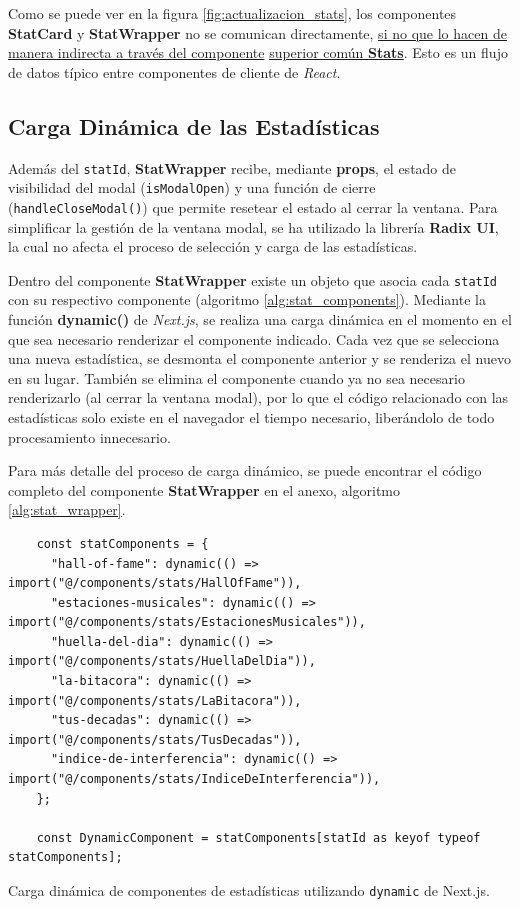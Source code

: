 Como se puede ver en la figura \ref{fig:actualizacion_stats}, los componentes \textbf{StatCard} y \textbf{StatWrapper} no se comunican directamente, \underline{si no que lo hacen de manera indirecta a través del componente} \underline{superior común \textbf{Stats}}. Esto es un flujo de datos típico entre componentes de cliente de \textit{React}.

\subsection*{Carga Dinámica de las Estadísticas}

Además del \texttt{statId}, \textbf{StatWrapper} recibe, mediante \textbf{props}, el estado de visibilidad del modal (\texttt{isModalOpen}) y una función de cierre (\texttt{handleCloseModal()}) que permite resetear el estado al cerrar la ventana. Para simplificar la gestión de la ventana modal, se ha utilizado la librería \textbf{Radix UI}, la cual no afecta el proceso de selección y carga de las estadísticas.

Dentro del componente \textbf{StatWrapper} existe un objeto que asocia cada \texttt{statId} con su respectivo componente (algoritmo \ref{alg:stat_components}). Mediante la función \textbf{dynamic()} de \textit{Next.js}, se realiza una carga dinámica en el momento en el que sea necesario renderizar el componente indicado. Cada vez que se selecciona una nueva estadística, se desmonta el componente anterior y se renderiza el nuevo en su lugar. También se elimina el componente cuando ya no sea necesario renderizarlo (al cerrar la ventana modal), por lo que el código relacionado con las estadísticas solo existe en el navegador el tiempo necesario, liberándolo de todo procesamiento innecesario.

Para más detalle del proceso de carga dinámico, se puede encontrar el código completo del componente \textbf{StatWrapper} en el anexo, algoritmo \ref{alg:stat_wrapper}.

\begin{ifalgorithm}[H]
    \begin{lstlisting}
    const statComponents = {
      "hall-of-fame": dynamic(() => import("@/components/stats/HallOfFame")),
      "estaciones-musicales": dynamic(() => import("@/components/stats/EstacionesMusicales")),
      "huella-del-dia": dynamic(() => import("@/components/stats/HuellaDelDia")),
      "la-bitacora": dynamic(() => import("@/components/stats/LaBitacora")),
      "tus-decadas": dynamic(() => import("@/components/stats/TusDecadas")),
      "indice-de-interferencia": dynamic(() => import("@/components/stats/IndiceDeInterferencia")),
    };

    const DynamicComponent = statComponents[statId as keyof typeof statComponents];
    \end{lstlisting}
    \caption{Carga dinámica de componentes de estadísticas utilizando \texttt{dynamic} de Next.js.}
    \label{alg:stat_components}
\end{ifalgorithm}

